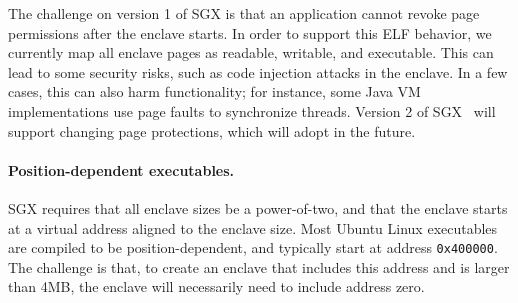The challenge on version 1 of SGX is that an application cannot revoke page
permissions after the enclave starts.
In order to support this ELF behavior, we currently map all enclave pages
as readable, writable, and executable.
This can lead to some security risks, such as code injection attacks in the enclave.
In a few cases, this can also harm functionality; for instance, some Java VM implementations
use page faults to synchronize threads.
Version 2 of SGX~\cite{sgx2} will support changing page protections,
which \graphenesgx{} will adopt in the future. %




\paragraph{Position-dependent executables.}
SGX requires that all enclave sizes be a power-of-two,
and that the enclave starts at a virtual address aligned to the enclave size.
Most Ubuntu Linux executables are compiled to be position-dependent, and typically 
start at address 
{\tt 0x400000}.  The challenge is that, to create an enclave  that includes this address and is larger than 4MB, the enclave
will necessarily need to include address zero.


